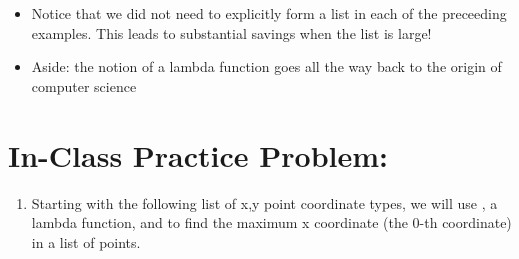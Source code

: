 \documentclass[letterpaper,10pt,english]{sphinxmanual}
\begin{document}
\begin{itemize}
\item {} 
Notice that we did not need to explicitly form a list in each of
the preceeding examples.  This leads to substantial savings when
the list is large!

\item {} 
Aside: the notion of a lambda function goes all the way back to
the origin of computer science

\end{itemize}


\section{In-Class Practice Problem:}
\label{\detokenize{lecture_notes/lec24_functional:in-class-practice-problem}}\begin{enumerate}
\item {} 
Starting with the following list of x,y point coordinate types, we
will use , a lambda function, and  to find the
maximum x coordinate (the 0-th coordinate) in a list of points.

%
\begin{sphinxVerbatim}[commandchars=\\\{\}]
  \PYG{p}{[}      \PYG{p}{]}
\end{sphinxVerbatim}

\end{enumerate}
\end{document}
